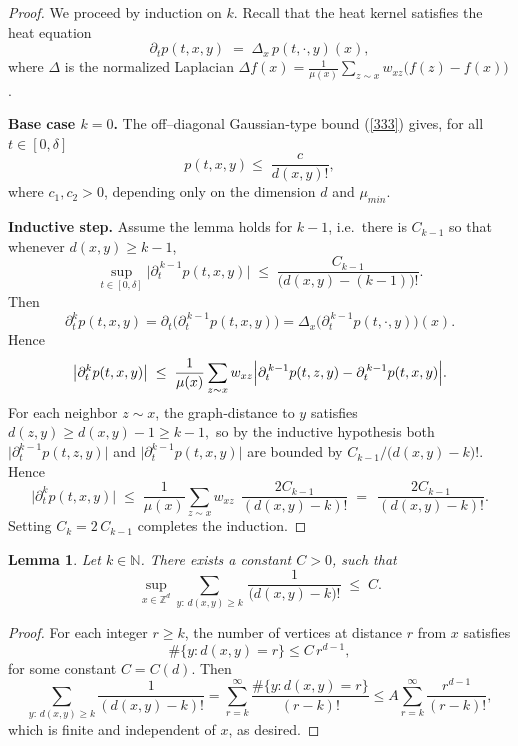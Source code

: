 \documentclass[reqno,12pt]{amsart}
\numberwithin{equation}{section}
\newtheorem{lemma}[theorem]{Lemma}
\begin{document}
\begin{proof}
	We proceed by induction on \(k\).  Recall that the heat kernel satisfies the heat equation
	\[
	\partial_t p(t,x,y) \;=\;\Delta_x\,p(t,\cdot,y)(x),
	\]
	where \(\Delta\) is the normalized Laplacian
	\(\Delta f(x)=\tfrac1{\mu(x)}\sum_{z\sim x}w_{xz}\bigl(f(z)-f(x)\bigr)\).
	
	\medskip\noindent\textbf{Base case \(k=0\).}  
	The off–diagonal Gaussian‐type bound (\ref{333}) gives, for all \(t\in[0,\delta]\) 
	\[
	p(t,x,y)\le\;
	\frac{c}{d(x,y)!},
	\]
	where $c_1,c_2>0$,  depending only on the dimension \(d\) and $\mu_{min}$.
	
	\medskip\noindent\textbf{Inductive step.}  
	Assume the lemma holds for \(k-1\), i.e.\ there is \(C_{k-1}\) so that whenever \(d(x,y)\ge k-1\),
	\[
	\sup_{t\in[0,\delta]}\bigl|\partial_t^{\,k-1}p(t,x,y)\bigr|
	\;\le\;
	\frac{C_{k-1}}{\bigl(d(x,y)- (k-1)\bigr)!}.
	\]
	Then
	\[
	\partial_t^k p(t,x,y)
	=\partial_t\bigl(\partial_t^{\,k-1}p(t,x,y)\bigr)
	=\Delta_x\bigl(\partial_t^{\,k-1}p(t,\cdot,y)\bigr)(x).
	\]
	Hence
	\[
	\bigl|\partial_t^k p(t,x,y)\bigr|
	\;\le\;
	\frac1{\mu(x)}\sum_{z\sim x}w_{xz}
	\Bigl|\partial_t^{\,k-1}p(t,z,y)-\partial_t^{\,k-1}p(t,x,y)\Bigr|.
	\]
	For each neighbor \(z\sim x\), the graph‐distance to \(y\) satisfies
	\(
	d(z,y)\ge d(x,y)-1\ge k-1,
	\)
	so by the inductive hypothesis both
	\(\bigl|\partial_t^{k-1}p(t,z,y)\bigr|\) and
	\(\bigl|\partial_t^{k-1}p(t,x,y)\bigr|\) are bounded by
	\(C_{k-1}/\bigl(d(x,y)-k\bigr)!\).  Hence
	\[
	\bigl|\partial_t^k p(t,x,y)\bigr|
	\;\le\;
	\frac1{\mu(x)}\sum_{z\sim x}w_{xz}
	\;\,\frac{2C_{k-1}}{(d(x,y)-k)!}
	\;=\;
	\,\frac{2C_{k-1}}{(d(x,y)-k)!}.
	\]
	Setting \(C_k=2\,C_{k-1}\) completes the induction.
\end{proof}


\begin{lemma} \label{lem:uniform‐bound‐factorial} 
	Let \(k \in \mathbb{N}\). There exists a constant \(C>0\), such that
	\[
	\sup_{x\in \mathbb{Z}^d}\sum_{y:\,d(x,y)\ge k}\,\frac{1}{\bigl(d(x,y)-k\bigr)!}
	\;\le\; C.
	\]
\end{lemma}

\begin{proof}
	For each integer \(r \ge k\), the number of vertices at distance \(r\) from \(x\) satisfies
	\[
	\#\{y : d(x,y) = r\} \le C\,r^{d-1},
	\]
	for some constant \(C = C(d)\). Then
	\[
	\sum_{y:\,d(x,y)\ge k} \frac{1}{(d(x,y) - k)!}
	= \sum_{r=k}^{\infty} \frac{\#\{y : d(x,y) = r\}}{(r - k)!}
	\le A \sum_{r=k}^{\infty} \frac{r^{d-1}}{(r - k)!},
	\]
	which is finite and independent of \(x\), as desired.
\end{proof}
\end{document}
